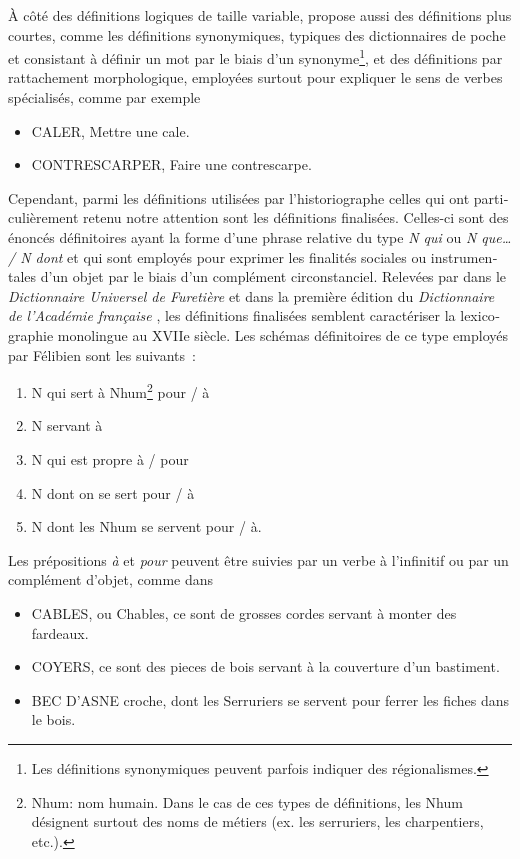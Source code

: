 \documentclass[output=paper,colorlinks,citecolor=brown,arabicfont,chinesefont,booklanguage=french]{langscibook}
\begin{document}
\begin{otherlanguage}{french}
À côté des définitions logiques de taille variable, \citet{Felibien1676} propose aussi des définitions plus courtes, comme les définitions synonymiques, typiques des dictionnaires de poche et consistant à définir un mot par le biais d’un synonyme\footnote{Les définitions synonymiques peuvent parfois indiquer des régionalismes.}, et des définitions par rattachement morphologique, employées surtout pour expliquer le sens de verbes spécialisés, comme par exemple

\begin{itemize}
    \item CALER, Mettre une cale.
    
    \item CONTRESCARPER, Faire une contrescarpe. 
\end{itemize}

Cependant, parmi les définitions utilisées par l’historiographe celles qui ont particulièrement retenu notre attention sont les définitions finalisées. Celles-ci sont des énoncés définitoires ayant la forme d’une phrase relative du type \emph{N qui} ou \emph{N que… / N dont} et qui sont employés pour exprimer les finalités sociales ou instrumentales d’un objet par le biais d’un complément circonstanciel. Relevées par  \citet{CollinotMazieret1990} dans le \emph{Dictionnaire Universel de Furetière} \citep{Furetière1690} et dans la première édition du \emph{Dictionnaire de l’Académie française} \citep{AcadFr1694}, les définitions finalisées semblent caractériser la lexicographie monolingue au XVIIe siècle. Les schémas définitoires de ce type employés par Félibien sont les suivants~:

\begin{enumerate}
    \item N qui sert à Nhum\footnote{Nhum: nom humain. Dans le cas de ces types de définitions, les Nhum désignent surtout des noms de métiers (ex. les serruriers, les charpentiers, etc.).} pour / à
    \item N servant à
    \item N qui est propre à / pour
    \item N dont on se sert pour / à 
    \item N dont les Nhum se servent pour / à. 
\end{enumerate}

Les prépositions \emph{à} et \emph{pour} peuvent être suivies par un verbe à l’infinitif ou par un complément d’objet, comme dans

\begin{itemize}
    \item CABLES, ou Chables, ce sont de grosses cordes servant à monter des fardeaux. 
    \item COYERS, ce sont des pieces de bois servant à la couverture d’un bastiment. 
    \item BEC D’ASNE croche, dont les Serruriers se servent pour ferrer les fiches dans le bois.
\end{itemize}


\end{otherlanguage}
\end{document}
